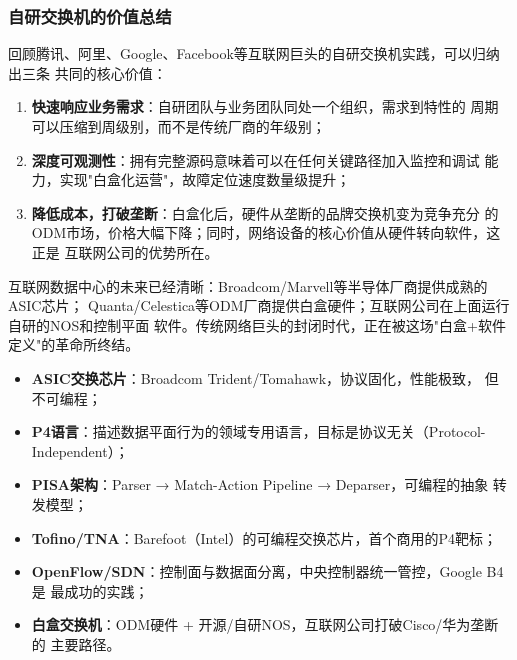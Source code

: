 \subsubsection{自研交换机的价值总结}

回顾腾讯、阿里、Google、Facebook等互联网巨头的自研交换机实践，可以归纳出三条
共同的核心价值：

\begin{enumerate}
  \item \textbf{快速响应业务需求}：自研团队与业务团队同处一个组织，需求到特性的
    周期可以压缩到周级别，而不是传统厂商的年级别；

  \item \textbf{深度可观测性}：拥有完整源码意味着可以在任何关键路径加入监控和调试
    能力，实现"白盒化运营"，故障定位速度数量级提升；

  \item \textbf{降低成本，打破垄断}：白盒化后，硬件从垄断的品牌交换机变为竞争充分
    的ODM市场，价格大幅下降；同时，网络设备的核心价值从硬件转向软件，这正是
    互联网公司的优势所在。
\end{enumerate}

互联网数据中心的未来已经清晰：Broadcom/Marvell等半导体厂商提供成熟的ASIC芯片；
Quanta/Celestica等ODM厂商提供白盒硬件；互联网公司在上面运行自研的NOS和控制平面
软件。传统网络巨头的封闭时代，正在被这场"白盒+软件定义"的革命所终结。

\begin{tcolorbox}[colback=blue!5!white, colframe=blue!50!black,
  title={\textbf{核心概念速览：从ASIC到P4的技术脉络}}]
\begin{itemize}
  \item \textbf{ASIC交换芯片}：Broadcom Trident/Tomahawk，协议固化，性能极致，
    但不可编程；
  \item \textbf{P4语言}：描述数据平面行为的领域专用语言，目标是协议无关（Protocol-Independent）；
  \item \textbf{PISA架构}：Parser → Match-Action Pipeline → Deparser，可编程的抽象
    转发模型；
  \item \textbf{Tofino/TNA}：Barefoot（Intel）的可编程交换芯片，首个商用的P4靶标；
  \item \textbf{OpenFlow/SDN}：控制面与数据面分离，中央控制器统一管控，Google B4是
    最成功的实践；
  \item \textbf{白盒交换机}：ODM硬件 + 开源/自研NOS，互联网公司打破Cisco/华为垄断的
    主要路径。
\end{itemize}
\end{tcolorbox}

